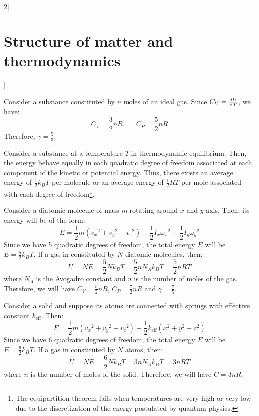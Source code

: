 \documentclass[../../../main.tex]{subfiles}
\begin{document}
\begin{multicols}{2}[\section{Structure of matter and thermodynamics}]
\begin{prop}
        Consider a substance constituted by $n$ moles of an ideal gas. Since $C_V=\dv{U}{T}$, we have: $$C_V=\frac{3}{2}nR\qquad C_P=\frac{5}{2}nR$$ Therefore, $\gamma=\frac{5}{3}$.
    \end{prop}
    \begin{theorem}
        Consider a substance at a temperature $T$ in thermodynamic equilibrium. Then, the energy behave equally in each quadratic degree of freedom associated at each component of the kinetic or potential energy. Thus, there exists an average energy of $\frac{1}{2}k_BT$ per molecule or an average energy of $\frac{1}{2}RT$ per mole associated with each degree of freedom\footnote{The equipartition theorem fails when temperatures are very high or very low due to the discretization of the energy postulated by quantum physics.}.
    \end{theorem}
    \begin{corollary}
        Consider a diatomic molecule of mass $m$ rotating around $x$ and $y$ axis. Then, its energy will be of the form:
        $$E=\frac{1}{2}m\left({v_x}^2+{v_y}^2+{v_z}^2\right)+\frac{1}{2}I_x{\omega_x}^2+\frac{1}{2}I_y{\omega_y}^2$$
        Since we have 5 quadratic degrees of freedom, the total energy $E$ will be $E=\frac{5}{2}k_BT$. If a gas in constituted by $N$ diatomic molecules, then:
        $$U=NE=\frac{5}{2}Nk_BT=\frac{5}{2}nN_Ak_BT=\frac{5}{2}nRT$$ where $N_A$ is the Avogadro constant and $n$ is the number of moles of the gas. Therefore, we will have $C_V=\frac{5}{2}nR$, $C_P=\frac{7}{2}nR$ and $\gamma=\frac{7}{5}$.
    \end{corollary}
    \begin{corollary}
        Consider a solid and suppose its atoms are connected with springs with effective constant $k_\text{eff}$. Then:
        $$E=\frac{1}{2}m\left({v_x}^2+{v_y}^2+{v_z}^2\right)+\frac{1}{2}k_\text{eff}\left(x^2+y^2+z^2\right)$$
        Since we have 6 quadratic degrees of freedom, the total energy $E$ will be $E=\frac{6}{2}k_BT$. If a gas in constituted by $N$ atoms, then:
        $$U=NE=\frac{6}{2}Nk_BT=3nN_Ak_BT=3nRT$$ where $n$ is the number of moles of the solid. Therefore, we will have $C=3nR$.
    \end{corollary}

\end{multicols}
\end{document}
